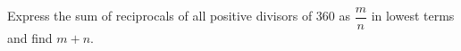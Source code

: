 Express the sum of reciprocals of all positive divisors of 360 as $\dfrac{m}{n}$ in lowest terms and find $m+n$.
